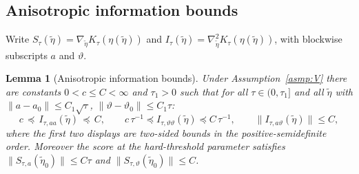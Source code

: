 \documentclass[11pt]{article}
\newtheorem{lemma}{Lemma}
\theoremstyle{definition}
\theoremstyle{plain}
\begin{document}
\subsection{Anisotropic information bounds}

Write $S_\tau(\tilde\eta)=\nabla_{\tilde\eta}K_\tau(\eta(\tilde\eta))$ and $I_\tau(\tilde\eta)=\nabla^2_{\tilde\eta}K_\tau(\eta(\tilde\eta))$, with blockwise subscripts $a$ and $\vartheta$.

\begin{lemma}[Anisotropic information bounds]
\label{lem:aniso_information}
Under Assumption~\ref{asmp:V} there are constants $0<c\le C<\infty$ and $\tau_1>0$ such that for all $\tau\in(0,\tau_1]$ and all $\tilde\eta$ with $\|a-a_0\|\le C_1\sqrt\tau$, $\|\vartheta-\vartheta_0\|\le C_1\tau$:
\[
c\,\preceq\, I_{\tau,aa}(\tilde\eta)\,\preceq\, C,\qquad
c\,\tau^{-1}\preceq I_{\tau,\vartheta\vartheta}(\tilde\eta)\preceq C\,\tau^{-1},\qquad
\|I_{\tau,a\vartheta}(\tilde\eta)\|\le C,
\]
where the first two displays are two-sided bounds in the positive-semidefinite order. Moreover the score at the hard-threshold parameter satisfies
$\|S_{\tau,a}(\tilde\eta_0)\|\le C\tau$ and $\|S_{\tau,\vartheta}(\tilde\eta_0)\|\le C$.
\end{lemma}
\end{document}
